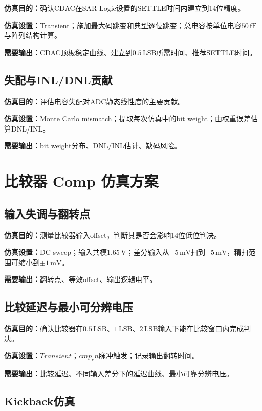 \documentclass[12pt,a4paper]{ctexart}
\begin{document}
\textbf{仿真目的：}确认CDAC在SAR Logic设置的SETTLE时间内建立到14位精度。

\textbf{仿真设置：}Transient；施加最大码跳变和典型逐位跳变；总电容按单位电容$50\,\mathrm{fF}$与阵列结构计算。

\textbf{需要输出：}CDAC顶板稳定曲线、建立到$0.5\,\mathrm{LSB}$所需时间、推荐SETTLE时间。

\subsection{失配与INL/DNL贡献}

\textbf{仿真目的：}评估电容失配对ADC静态线性度的主要贡献。

\textbf{仿真设置：}Monte Carlo mismatch；提取每次仿真中的bit weight；由权重误差估算DNL/INL。

\textbf{需要输出：}bit weight分布、DNL/INL估计、缺码风险。

\section{比较器 Comp 仿真方案}

\subsection{输入失调与翻转点}

\textbf{仿真目的：}测量比较器输入offset，判断其是否会影响14位低位判决。

\textbf{仿真设置：}DC sweep；输入共模$1.65\,\mathrm{V}$；差分输入从$-5\,\mathrm{mV}$扫到$+5\,\mathrm{mV}$，精扫范围可缩小到$\pm1\,\mathrm{mV}$。

\textbf{需要输出：}翻转点、等效offset、输出逻辑电平。

\subsection{比较延迟与最小可分辨电压}

\textbf{仿真目的：}确认比较器在$0.5\,\mathrm{LSB}$、$1\,\mathrm{LSB}$、$2\,\mathrm{LSB}$输入下能在比较窗口内完成判决。

\textbf{仿真设置：}$Transient；cmp_en$脉冲触发；记录输出翻转时间。

\textbf{需要输出：}比较延迟、不同输入差分下的延迟曲线、最小可靠分辨电压。

\subsection{Kickback仿真}
\end{document}

